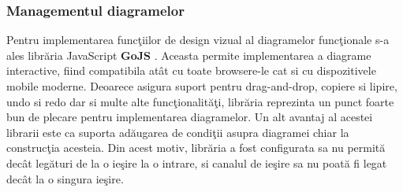 \subsubsection{Managementul diagramelor}
Pentru implementarea funcţiilor de design vizual al diagramelor funcţionale s-a ales librăria JavaScript \textbf{GoJS} \autocite{gojs}. Aceasta permite implementarea a diagrame interactive, fiind compatibila atât cu toate browsere-le cat si cu dispozitivele mobile moderne. Deoarece asigura suport pentru drag-and-drop, copiere si lipire, undo si redo dar si multe alte funcţionalităţi, librăria reprezinta un punct foarte bun de plecare pentru implementarea diagramelor. Un alt avantaj al acestei librarii este ca suporta adăugarea de condiţii asupra diagramei chiar la construcţia acesteia. Din acest motiv, librăria a fost configurata sa nu permită  decât legături de la o ieşire la o intrare, si canalul de ieşire sa nu poată fi legat decât la o singura ieşire.

